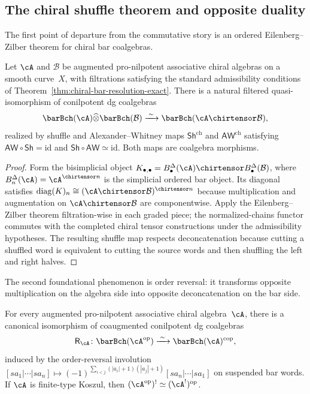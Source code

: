 \subsection{The chiral shuffle theorem and opposite duality}

The first point of departure from the commutative story is an ordered
Eilenberg--Zilber theorem for chiral bar coalgebras.

\begin{theorem}
\label{thm:ordered-shuffle}
Let $\cA$ and $\mathcal{B}$ be augmented pro-nilpotent associative
chiral algebras on a smooth curve~$X$, with filtrations satisfying
the standard admissibility conditions of
Theorem~\textup{\ref{thm:chiral-bar-resolution-exact}}.
There is a natural filtered quasi-isomorphism of conilpotent dg
coalgebras
\[
 \barBch(\cA) \widehat\otimes \barBch(\mathcal{B})
 \xrightarrow{\;\sim\;}
 \barBch(\cA \chirtensor \mathcal{B}),
\]
realized by shuffle and Alexander--Whitney maps
$\mathsf{Sh}^{\mathrm{ch}}$ and $\mathsf{AW}^{\mathrm{ch}}$
satisfying $\mathsf{AW} \circ \mathsf{Sh} = \mathrm{id}$ and
$\mathsf{Sh} \circ \mathsf{AW} \simeq \mathrm{id}$. Both maps are
coalgebra morphisms.
\end{theorem}

\begin{proof}
Form the bisimplicial object
$K_{\bullet,\bullet} = B^\Delta_\bullet(\cA) \chirtensor
B^\Delta_\bullet(\mathcal{B})$, where $B^\Delta_n(\cA) =
\cA^{\chirtensor n}$ is the simplicial ordered bar object. Its
diagonal satisfies $\operatorname{diag}(K)_n \cong
(\cA \chirtensor \mathcal{B})^{\chirtensor n}$ because
multiplication and augmentation on
$\cA \chirtensor \mathcal{B}$ are componentwise. Apply the
Eilenberg--Zilber theorem filtration-wise in each graded piece;
the normalized-chains functor commutes with the completed chiral
tensor constructions under the admissibility hypotheses. The
resulting shuffle map respects deconcatenation because cutting a
shuffled word is equivalent to cutting the source words and then
shuffling the left and right halves.
\end{proof}

The second foundational phenomenon is order reversal: it transforms
opposite multiplication on the algebra side into opposite
deconcatenation on the bar side.

\begin{theorem}
\label{thm:ordered-opposite}
For every augmented pro-nilpotent associative chiral algebra~$\cA$,
there is a canonical isomorphism of coaugmented conilpotent dg
coalgebras
\[
 \mathsf{R}_\cA \colon
 \barBch(\cA^{\mathrm{op}})
 \xrightarrow{\;\sim\;}
 \barBch(\cA)^{\mathrm{cop}},
\]
induced by the order-reversal involution
$[sa_1|\cdots|sa_n] \mapsto
(-1)^{\sum_{i<j}(|a_i|+1)(|a_j|+1)}
[sa_n|\cdots|sa_1]$
on suspended bar words. If $\cA$ is finite-type Koszul, then
$(\cA^{\mathrm{op}})^! \simeq (\cA^!)^{\mathrm{op}}$.
\end{theorem}

